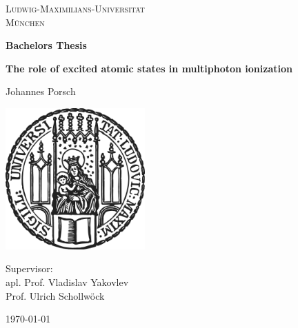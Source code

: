 \begin{titlepage}
    \centering
    
    \begin{center}
        {\Large\textsc{Ludwig-Maximilians-Universität}}\\
        \vspace{0.25cm}
        {\Large\textsc{München}}
    \end{center}

    \vspace{0.5cm}

    
    \vspace{2cm}

    {\Large \bfseries Bachelors Thesis}

    \vspace{0.5cm}
    
    {\huge\bfseries The role of excited atomic states in multiphoton ionization\\[0.4cm]}
    
    \vspace{1.5cm}
    
    {\Large Johannes Porsch}
    
    
    \vfill
    
    \includegraphics[width = 0.4\textwidth]{figures/sigillum.png}

     \vfill
    
    Supervisor: \\apl. Prof. Vladislav Yakovlev \\Prof. Ulrich Schollwöck 

    \vfill
    
    {\Large \today}
    
\end{titlepage}